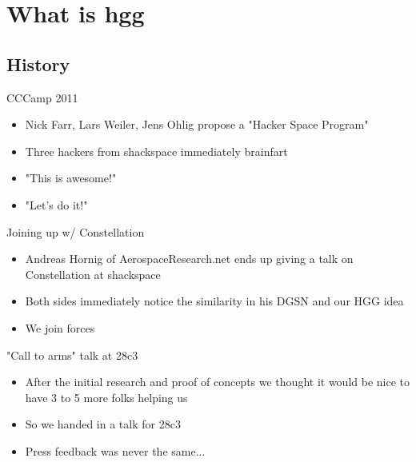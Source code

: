 
\newlength{\smallcol}
\setlength{\smallcol}{0.333333333333\textwidth}

\newlength{\bigcol}
\setlength{\bigcol}{\textwidth}
\addtolength{\bigcol}{- \smallcol}


\begin{frame}[plain]
\end{frame}

\section{What is hgg}

\subsection{History}
	\begin{frame}{CCCamp 2011}
		\begin{itemize}
			\item Nick Farr, Lars Weiler, Jens Ohlig propose a "Hacker Space Program"
			\item Three hackers from shackspace immediately brainfart
			\item "This is awesome!"
			\item "Let's do it!"
		\end{itemize}
	\end{frame}
	\begin{frame}{Joining up w/ Constellation}
		\begin{itemize}
			\item Andreas Hornig of AerospaceResearch.net ends up giving a talk on Constellation at shackspace
			\item Both sides immediately notice the similarity in his DGSN and our HGG idea
			\item We join forces
		\end{itemize}
	\end{frame}
	\begin{frame}{"Call to arms" talk at 28c3}
		\begin{itemize}
			\item After the initial research and proof of concepts we thought it would be nice to have 3 to 5 more folks helping us
			\item So we handed in a talk for 28c3
			\item Press feedback was never the same...
		\end{itemize}
	\end{frame}
